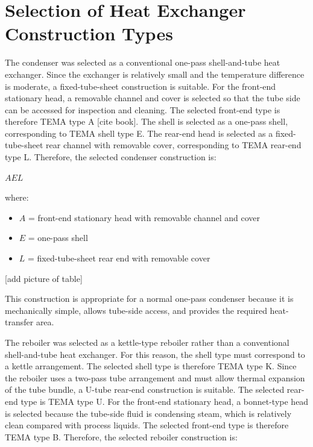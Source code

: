 \section{Selection of Heat Exchanger Construction
Types}\label{selection-of-heat-exchanger-construction-types}

The condenser was selected as a conventional one-pass shell-and-tube
heat exchanger. Since the exchanger is relatively small and the
temperature difference is moderate, a fixed-tube-sheet construction is
suitable. For the front-end stationary head, a removable channel and
cover is selected so that the tube side can be accessed for inspection
and cleaning. The selected front-end type is therefore TEMA type A
{[}cite book{]}. The shell is selected as a one-pass shell,
corresponding to TEMA shell type E. The rear-end head is selected as a
fixed-tube-sheet rear channel with removable cover, corresponding to
TEMA rear-end type L. Therefore, the selected condenser construction is:

\(AEL\)

where:

\begin{itemize}
\tightlist
\item
  \(A\) = front-end stationary head with removable channel and cover
\item
  \(E\) = one-pass shell
\item
  \(L\) = fixed-tube-sheet rear end with removable cover
\end{itemize}

{[}add picture of table{]}

This construction is appropriate for a normal one-pass condenser because
it is mechanically simple, allows tube-side access, and provides the
required heat-transfer area.

The reboiler was selected as a kettle-type reboiler rather than a
conventional shell-and-tube heat exchanger. For this reason, the shell
type must correspond to a kettle arrangement. The selected shell type is
therefore TEMA type K. Since the reboiler uses a two-pass tube
arrangement and must allow thermal expansion of the tube bundle, a
U-tube rear-end construction is suitable. The selected rear-end type is
TEMA type U. For the front-end stationary head, a bonnet-type head is
selected because the tube-side fluid is condensing steam, which is
relatively clean compared with process liquids. The selected front-end
type is therefore TEMA type B. Therefore, the selected reboiler
construction is:

